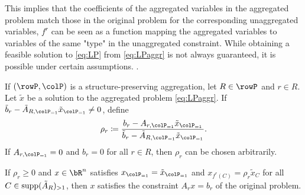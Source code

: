 \vspace{0.5cm}
This implies that the coefficients of the aggregated variables in the aggregated problem match those
 in the original problem for the corresponding unaggregated variables, \(f^r\) can be seen as a 
 function mapping the aggregated variables to variables of the same "type" in the unaggregated
  constraint.
 While obtaining a feasible solution to \eqref{eq:LP} from \eqref{eq:LPaggr} is not always guaranteed,
  it is possible under certain assumptions.
.
\begin{observation}
\label{ob:aggrconstr}
If \((\rowP, \colP)\) is a structure-preserving aggregation, let \(R \in \rowP\) and \(r \in R\). Let \(\tilde{x}\) be a solution
 to the aggregated problem \eqref{eq:LPaggr}. 
If \(\tilde{b}_r - \tilde{A}_{R, \colP_{=1}} \tilde{x}_{\colP_{=1}} \neq 0\), define 
\[\rho_r \coloneqq \frac{b_r - A_{r, \colP_{=1}} \tilde{x}_{\colP_{=1}}}{\tilde{b}_r
 - \tilde{A}_{R, \colP_{=1}} \tilde{x}_{\colP_{=1}}}.\]
  If \(A_{r, \colP_{=1}} = 0\) and \(b_r = 0\) for all \(r \in R\), then \(\rho_r\) can be chosen arbitrarily. 

If \(\rho_r \geq 0\) and \(x \in \bR^n\) satisfies \(x_{\colP_{=1}} = \tilde{x}_{\colP_{=1}}\) and \(x_{f^r(C)} = \rho_r \tilde{x}_C\) for all \(C \in \operatorname{supp}(\tilde{A}_R)_{>1}\), then \(x\) satisfies the constraint \(A_r x = b_r\) of the original problem.
\end{observation}

